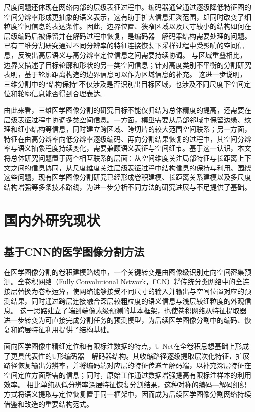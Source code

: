 尺度问题还体现在网络内部的层级表征过程中。编码器通常通过逐级降低特征图的空间分辨率形成更抽象的语义表示，这有助于扩大信息汇聚范围，却同时改变了细粒度空间信息的表达条件。因此，边界位置、狭窄区域以及尺寸较小的结构如何在层级编码后被保留并在解码过程中恢复，是编码器—解码器结构需要处理的问题。已有三维分割研究通过不同分辨率的特征连接恢复下采样过程中受影响的空间信息，反映出高层语义与高分辨率定位信息之间需要持续协调。\cite{hatamizadeh2022unetr} 与区域重叠相比，边界又描述了目标轮廓和形状的另一类空间信息；针对高度类别不平衡的分割研究表明，基于轮廓距离构造的边界信息可以作为区域信息的补充。\cite{kervadec2021boundary} 这进一步说明，三维分割中的“结构保持”不仅涉及是否识别出目标区域，也涉及不同尺度下空间定位和轮廓信息能否得到合理表达。

由此来看，三维医学图像分割的研究目标不能仅归结为总体精度的提高，还需要在层级表征过程中协调多类空间信息。一方面，模型需要从局部邻域中保留边缘、纹理和细小结构等信息，同时建立跨区域、跨切片的较大范围空间联系；另一方面，特征在由高分辨率向低分辨率逐级编码、再向分割结果恢复的过程中，其空间分辨率与语义抽象程度持续变化，需要兼顾语义表征与空间细节。基于这一认识，本文将总体研究问题置于两个相互联系的层面：从空间维度关注局部特征与长距离上下文之间的信息协同，从尺度维度关注层级表征过程中结构信息的保持与利用。围绕这些问题，现有医学图像分割研究已经形成卷积建模、长距离关系建模以及多尺度结构增强等多条技术路线，为进一步分析不同方法的研究进展与不足提供了基础。

\section{国内外研究现状}

\subsection{基于CNN的医学图像分割方法}

在医学图像分割的卷积建模路线中，一个关键转变是由图像级识别走向空间密集预测。全卷积网络（Fully Convolutional Network，FCN）将传统分类网络中的全连接层替换为卷积运算，使网络能够接受不同尺寸的输入并输出与空间位置对应的预测结果，同时通过跨层连接融合深层较粗粒度的语义信息与浅层较细粒度的外观信息。\cite{long2015fcn} 这一思路建立了端到端像素级预测的基本框架，也使卷积网络从特征提取器进一步转变为可直接完成分割任务的预测模型，为后续医学图像分割中的编码、恢复和跨层特征利用提供了结构基础。

面向医学图像中精细定位和有限标注数据的特点，U-Net在全卷积思想基础上形成了更具代表性的U形编码器—解码器结构。其收缩路径逐级提取层次化特征，扩展路径恢复输出分辨率，并将编码端对应层的特征传递至解码端，以补充深层特征在空间定位方面所需的信息；同时，原始工作通过数据增强提高有限标注样本的利用效率。\cite{ronneberger2015unet} 相比单纯从低分辨率深层特征恢复分割结果，这种对称的编码—解码组织方式将语义提取与定位恢复置于同一框架中，因而成为后续医学图像分割网络持续借鉴和改造的重要结构范式。

